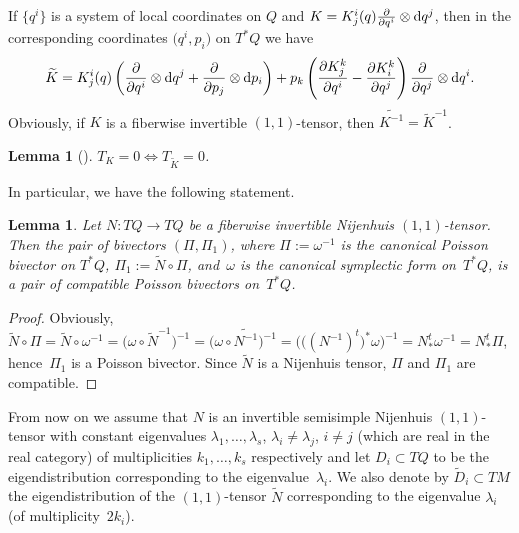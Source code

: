 \documentclass[10pt,a4paper]{amsart}
\numberwithin{equation}{section}
\newtheorem{Lemma}[Theorem]{Lemma}
\begin{document}
If $\{q^i\}$ is a system of local coordinates on $Q$ and $K=K^i_j (q) \frac{\partial}{\partial q^i } \otimes {\rm d}q^j $, then in the corresponding coordinates $\big(q^i, p_i\big)$ on $T^*Q$ we have
\begin{gather*}
\widetilde{K}= K^i_j (q) \left( \frac{\partial}{\partial q^i } \otimes {\rm d}q^j + \frac{\partial}{\partial p_j } \otimes {\rm d}p_i \right)
+ p_k \left( \frac{\partial K^k_j }{\partial q^i} - \frac{\partial K^k_i }{\partial q^j} \right) \frac{\partial}{\partial q^j}\otimes {\rm d}q^i
.\end{gather*}
Obviously, if $K$ is a fiberwise invertible $(1,1)$-tensor, then $\widetilde{K^{-1}}=\widetilde{K}^{-1}$.

\begin{Lemma}[\cite{t12}]\label{tors} $T_K=0\Longleftrightarrow T_{\widetilde{K}}=0$.
\end{Lemma}

In particular, we have the following statement.

\begin{Lemma}\label{constt}Let $N\colon TQ\to TQ$ be a fiberwise invertible Nijenhuis $(1,1)$-tensor. Then the pair of bivectors $(\Pi,\Pi_1)$, where $\Pi:=\omega^{-1}$ is the canonical Poisson bivector on $T^*Q$, $\Pi_1:=\widetilde{N}\circ\Pi$, and~$\omega $ is the canonical symplectic form on~$T^*Q$, is a pair of compatible Poisson bivectors on~$T^*Q$.
\end{Lemma}

\begin{proof} Obviously, $\widetilde{N}\circ\Pi=\widetilde{N}\circ \omega^{-1}=\big(\omega\circ \widetilde{N}^{-1}\big)^{-1}=\big(\omega\circ \widetilde{N^{-1}}\big)^{-1}=\big(\big((N^{-1})^t\big)^*\omega\big)^{-1}=N^t_*\omega^{-1}=N^t_*\Pi$, hence~$\Pi_1$ is a Poisson bivector. Since $\widetilde{N}$ is a Nijenhuis tensor, $\Pi$ and $\Pi_1$ are compatible.
\end{proof}

From now on we assume that $N$ is an invertible semisimple Nijenhuis $(1,1)$-tensor with constant eigenvalues $\lambda_1,\dots,\lambda_s$, $\lambda_i\not=\lambda_j$, $i\not=j$ (which are real in the real category) of multiplicities $k_1,\dots,k_s$ respectively and let $D_i \subset TQ$ to be the eigendistribution corresponding to the eigenvalue~$\lambda_i$. We also denote by $\widetilde{ D}_i \subset TM$ the eigendistribution of the $(1,1)$-tensor $\widetilde{N}$ corresponding to the eigenvalue $\lambda_i$ (of multiplicity~$2k_i$).
\end{document}
